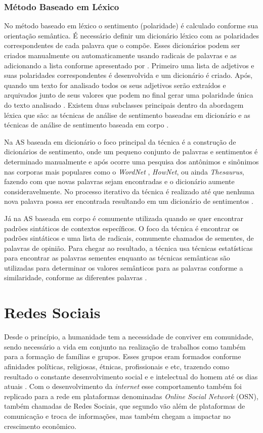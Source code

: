 \subsubsection{Método Baseado em Léxico}
\label{subsubsec:lexico}
No método baseado em léxico o sentimento (polaridade) é calculado conforme sua orientação semântica. É necessário definir um dicionário léxico com as polaridades correspondentes de cada palavra que o compõe. Esses dicionários podem ser criados manualmente ou automaticamente usando radicais de palavras e as adicionando a lista conforme apresentado por . Primeiro uma lista de adjetivos e suas polaridades correspondentes é desenvolvida e um dicionário é criado. Após, quando um texto for analisado todos os seus adjetivos serão extraídos e arquivados junto de seus valores que podem no final gerar uma polaridade única do texto analisado \cite{Taboada}. Existem duas subclasses principais dentro da abordagem léxica que são: as técnicas de análise de sentimento baseadas em dicionário e as técnicas de análise de sentimento baseada em corpo \cite{LIU2017149}.

Na AS baseada em dicionário o foco principal da técnica é a construção de dicionários de sentimento, onde um pequeno conjunto de palavras e sentimentos é determinado manualmente e após ocorre uma pesquisa dos antônimos e sinônimos nas corporas mais populares como o \textit{WordNet} \cite{Miller:1995:WLD:219717.219748}, \textit{HowNet}, ou ainda \textit{Thesaurus}, fazendo com que novas palavras sejam encontradas e o dicionário aumente consideravelmente. No processo iterativo da técnica é realizado até que nenhuma nova palavra possa ser encontrada resultando em um dicionário de sentimentos \cite{LIU2017149}. 

Já na AS baseada em corpo é comumente utilizada quando se quer encontrar padrões sintáticos de contextos específicos. O foco da técnica é encontrar os padrões sintáticos e uma lista de radicais, comumente chamados de sementes, de palavras de opinião. Para chegar ao resultado, a técnica usa técnicas estatísticas para encontrar as palavras sementes enquanto as técnicas semânticas são utilizadas para determinar os valores semânticos para as palavras conforme a similaridade, conforme as diferentes palavras \cite{LIU2017149}.

\section{Redes Sociais}
\label{sec:RedesSociais}
Desde o princípio, a humanidade tem a necessidade de conviver em comunidade, sendo necessário a vida em conjunto na realização de trabalhos como também para a formação de famílias e grupos. Esses grupos eram formados conforme afinidades políticas, religiosas, étnicas, profissionais e etc, trazendo como resultado o constante desenvolvimento social e e intelectual do homem até os dias atuais \cite{KHALED2018}. Com o desenvolvimento da \textit{internet} esse comportamento também foi replicado para a rede em plataformas denominadas \textit{Online Social Network} (OSN), também chamadas de Redes Sociais, que segundo  vão além de plataformas de comunicação e troca de informações, mas também chegam a impactar no crescimento econômico. 

